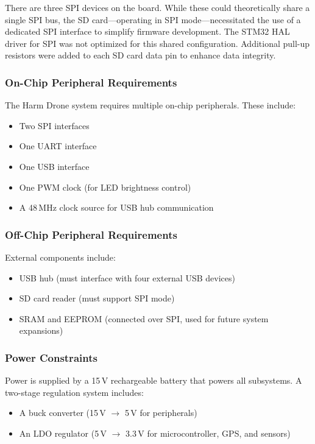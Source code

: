 \documentclass[12pt]{article}
\begin{document}
\par There are three SPI devices on the board. While these could theoretically share a single SPI bus, the SD card—operating in SPI mode—necessitated the use of a dedicated SPI interface to simplify firmware development. The STM32 HAL driver for SPI was not optimized for this shared configuration. Additional pull-up resistors were added to each SD card data pin to enhance data integrity.

\subsubsection{On-Chip Peripheral Requirements}

The Harm Drone system requires multiple on-chip peripherals. These include:
\begin{itemize}
    \item Two SPI interfaces
    \item One UART interface
    \item One USB interface
    \item One PWM clock (for LED brightness control)
    \item A 48\,MHz clock source for USB hub communication
\end{itemize}

\subsubsection{Off-Chip Peripheral Requirements}

External components include:
\begin{itemize}
    \item USB hub (must interface with four external USB devices)
    \item SD card reader (must support SPI mode)
    \item SRAM and EEPROM (connected over SPI, used for future system expansions)
\end{itemize}

\subsubsection{Power Constraints}

Power is supplied by a 15\,V rechargeable battery that powers all subsystems. A two-stage regulation system includes:
\begin{itemize}
    \item A buck converter (15\,V $\rightarrow$ 5\,V for peripherals)
    \item An LDO regulator (5\,V $\rightarrow$ 3.3\,V for microcontroller, GPS, and sensors)
\end{itemize}
\end{document}
